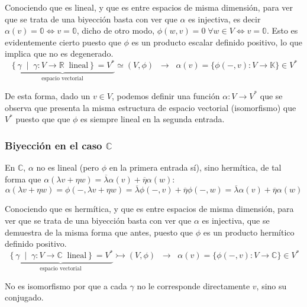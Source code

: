 \documentclass{preset}
\newcommand{\compconj}[1]{%
  \overline{#1}%
}
\begin{document}
\vspace{-10pt}
\noindent Conociendo que es lineal, y que es entre espacios de misma dimensión, para ver que se trata de una biyección basta con ver que $\alpha$ es injectiva, es decir $\alpha(v)=\mathbb{0} \iff v=\mathbb{0}$, dicho de otro modo, $\phi(w,v)=0 \; \forall w \in V  \iff v=\mathbb{0}$.
Esto es evidentemente cierto puesto que $\phi$ es un producto escalar definido positivo, lo que implica que no es degenerado.
\pagebreak
\phantom{.}
\vspace{-550pt}
\[ \underbrace{\left\{ \gamma \;\; \vert \;\; \gamma: V \rightarrow \mathbb{R} \;\; \mbox{lineal} \right\} = V^*}_{\mbox{espacio vectorial}}  \simeq (V,\phi) \;\;\rightarrow\;\; \alpha(v)=\{\phi(-,v): V \rightarrow \mathbb{K}\} \in V^*\]

De esta forma, dado un $v\in V$, podemos definir una función $\alpha:V\rightarrow V^*$ que se observa que presenta la misma estructura de espacio vectorial (isomorfismo) que $V^*$ puesto que que $\phi$ es siempre lineal en la segunda entrada.

\vspace{-15pt}
\subsubsection{Biyección en el caso $\mathbb{C}$}
En $\mathbb{C}$, $\alpha$ no es lineal (pero $\phi$ en la primera entrada sí), sino hermítica, de tal forma que $\alpha(\lambda v + \eta w)= \compconj{\lambda} \alpha(v) + \compconj{\eta} \alpha(w)$:
\vspace{-10pt}
\[\alpha(\lambda v + \eta w) = \phi(-,\lambda v + \eta w)=\compconj{\lambda} \phi(-,v)+\compconj{\eta} \phi(-,w)=\compconj{\lambda} \alpha(v) + \compconj{\eta} \alpha(w)\]

\vspace{-10pt}
\noindent Conociendo que es hermítica, y que es entre espacios de misma dimensión, para ver que se trata de una biyección basta con ver que $\alpha$ es injectiva, que se demuestra de la misma forma que antes, puesto que $\phi$ es un producto hermítico definido positivo.
\vspace{-10pt}
\[ \underbrace{\left\{ \gamma \;\; \vert \;\; \gamma: V \rightarrow \mathbb{C} \;\; \mbox{lineal} \right\} = V^*}_{\mbox{espacio vectorial}} \rightarrowtail  (V,\phi) \;\;\rightarrow\;\; \alpha(v)=\{\phi(-,v): V \rightarrow \mathbb{C}\} \in V^*\]

No es isomorfismo por que a cada $\gamma$ no le corresponde directamente $v$, sino su conjugado.
\end{document}
